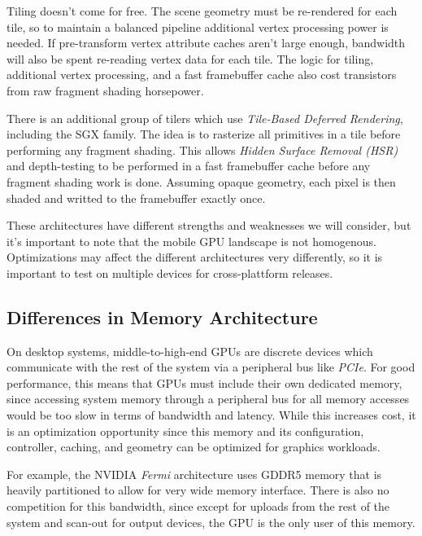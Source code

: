 Tiling doesn't come for free.  The scene geometry must be re-rendered for each tile, so to maintain a balanced pipeline additional vertex processing power is needed.  If pre-transform vertex attribute caches aren't large enough, bandwidth will also be spent re-reading vertex data for each tile.  The logic for tiling, additional vertex processing, and a fast framebuffer cache also cost transistors from raw fragment shading horsepower.

 There is an additional group of tilers
which use \textit{Tile-Based Deferred Rendering}, including the SGX family.
The idea is to rasterize all primitives in a tile before performing any
fragment shading.  This allows \textit{Hidden Surface Removal (HSR)} and
depth-testing to be performed in a fast framebuffer cache before any fragment
shading work is done.  Assuming opaque geometry, each pixel is then shaded and
writted to the framebuffer exactly once.

These architectures have different strengths and weaknesses we will consider,
but it's important to note that the mobile GPU landscape is not homogenous.
Optimizations may affect the different architectures very differently, so it is
important to test on multiple devices for cross-plattform releases.
\subsection{Differences in Memory
Architecture}\label{Jon-McCaffrey:differences-in-memory-architecture}

On desktop systems, middle-to-high-end GPUs are discrete devices which
communicate with the rest of the system via a peripheral bus like
\textit{PCIe}.  For good performance, this means that GPUs must include their
own dedicated memory, since accessing system memory through a peripheral bus
for all memory accesses would be too slow in terms of bandwidth and latency.
While this increases cost, it is an optimization opportunity since this memory and 
its configuration, controller, caching, and geometry
can be optimized for graphics workloads.

For example, the NVIDIA \textit{Fermi} architecture uses GDDR5 memory that is
heavily partitioned \cite{Walton10} to allow for very wide memory interface.
There is also no competition for this bandwidth, since except for uploads from
the rest of the system and scan-out for output devices, the GPU is the only
user of this memory.

 

